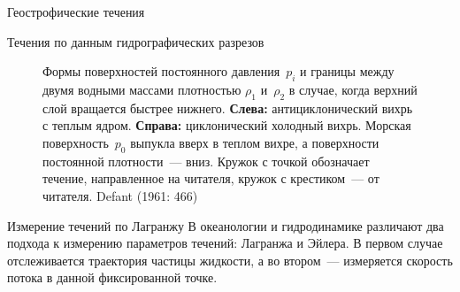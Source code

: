 \begin{chapter}{Геострофические течения}
\begin{section}{Течения по данным гидрографических разрезов}
\begin{figure}[h!]
\caption{Формы поверхностей постоянного давления~$p_i$ и границы между
двумя водными массами плотностью $\rho_1$ и~$\rho_2$ в случае, 
когда верхний слой вращается быстрее нижнего. 
\textbf{Слева:} антициклонический вихрь с теплым ядром. 
\textbf{Справа:} циклонический холодный вихрь. 
Морская поверхность~$p_0$ выпукла вверх в теплом вихре, а поверхности 
постоянной плотности~--- вниз. Кружок с точкой обозначает течение, 
направленное на читателя, кружок с крестиком~--- от читателя. 
Defant (1961: 466)}
\label{fig:rings}
\end{figure}
%
\end{section}

\begin{section}{Измерение течений по Лагранжу}\label{sec:LagrangianMeters}
В океанологии и гидродинамике различают два подхода к измерению параметров
течений: Лагранжа и Эйлера. В первом случае отслеживается траектория 
частицы жидкости, а во втором~--- измеряется скорость потока в данной 
фиксированной точке.
%


\end{section}
\end{chapter}
